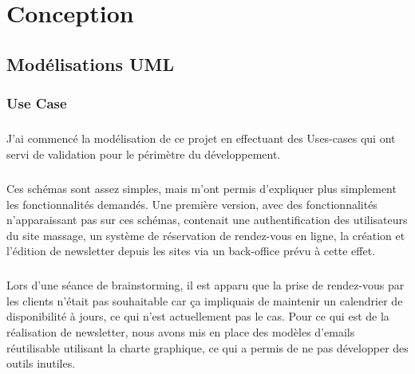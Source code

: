 \documentclass[11pt,a4paper]{report}
\begin{document}
\chapter{Conception}
	\section{Modélisations UML}
			\subsection{Use Case}
				\paragraph*{}J'ai commencé la modélisation de ce projet en effectuant des Uses-cases qui ont servi de validation pour le périmètre du développement.
				\paragraph*{}Ces schémas sont assez simples, mais m'ont permis d'expliquer plus simplement les fonctionnalités demandés. Une première version, avec des fonctionnalités n'apparaissant pas sur ces schémas, contenait une authentification des utilisateurs du site massage, un système de réservation de rendez-vous en ligne, la création et l'édition de newsletter depuis les sites via un back-office prévu à cette effet.
				\paragraph*{}Lors d'une séance de brainstorming, il est apparu que la prise de rendez-vous par les clients n'était pas souhaitable car ça impliquais de maintenir un calendrier de disponibilité à jours, ce qui n'est actuellement pas le cas. Pour ce qui est de la réalisation de newsletter, nous avons mis en place des modèles d'emails réutilisable utilisant la charte graphique, ce qui a permis de ne pas développer des outils inutiles.
\end{document}
